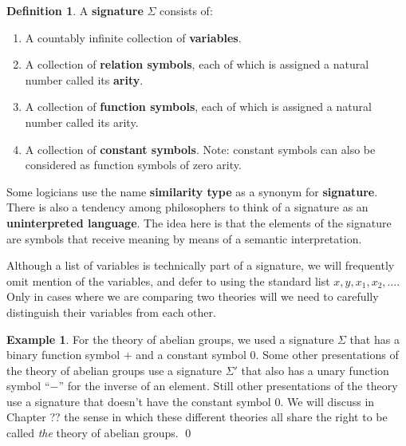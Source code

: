 \documentclass[11pt,fleqn]{article}
\theoremstyle{definition}
\newtheorem*{defn}{Definition}
\newtheorem*{example}{Example}
\theoremstyle{remark}
\newcommand{\2}{\mathscr}
\renewcommand{\emph}{\textbf}
\begin{document}
\begin{defn} A \textbf{signature} $\Sigma$ consists of:
  \begin{enumerate} \item A countably infinite collection of
    \textbf{variables}.
  \item A collection of \textbf{relation symbols}, each of which is
    assigned a natural number called its \textbf{arity}.
  \item A collection of \textbf{function symbols}, each of which is assigned a
    natural number called its arity.
  \item A collection of \textbf{constant symbols}.  Note: constant
    symbols can also be considered as function symbols of zero
    arity. \end{enumerate}
\end{defn}

Some logicians use the name \emph{similarity type} as a synonym for
\emph{signature}.  There is also a tendency among philosophers to
think of a signature as an \emph{uninterpreted language}.  The idea
here is that the elements of the signature are symbols that receive
meaning by means of a semantic interpretation.

Although a list of variables is technically part of a signature, we
will frequently omit mention of the variables, and defer to using the
standard list $x,y,x_1,x_2,\dots $.  Only in cases where we are
comparing two theories will we need to carefully distinguish their
variables from each other.

\begin{example} For the theory of abelian groups, we used a signature
  $\Sigma$ that has a binary function symbol $+$ and a constant symbol
  $0$.  Some other presentations of the theory of abelian groups use a
  signature $\Sigma '$ that also has a unary function symbol ``$-$''
  for the inverse of an element.  Still other presentations of the
  theory use a signature that doesn't have the constant symbol $0$.
  We will discuss in Chapter ?? the sense in which these different
  theories all share the right to be called \textit{the} theory of
  abelian groups.  \hfill \qed \end{example}
\end{document}
